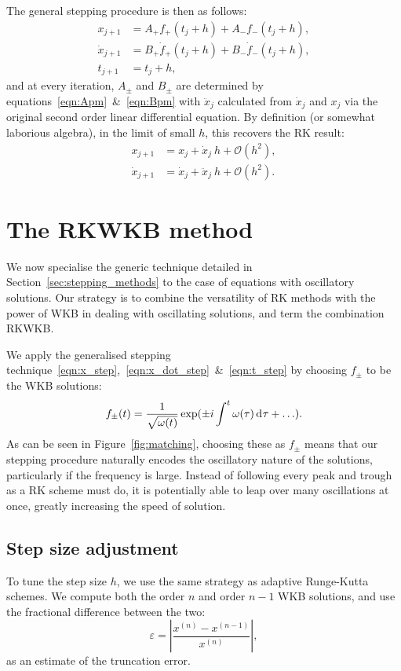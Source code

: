 The general stepping procedure is then as follows:
\begin{align}
  x_{j+1} &= A_+ f_+(t_j + h) + A_- f_-(t_j + h),
  \label{eqn:x_step} \\
  \dot{x}_{j+1} &= B_+ \dot{f}_+(t_j + h) + B_- \dot{f}_-(t_j + h),
  \label{eqn:x_dot_step} \\
  t_{j+1} &= t_j+h,
  \label{eqn:t_step}
\end{align}
and at every iteration, \(A_\pm\) and \(B_\pm\) are determined by equations~\eqref{eqn:Apm}~\&~\eqref{eqn:Bpm} with \(\ddot{x}_j\) calculated from \(\dot{x}_j\) and \(x_j\) via the original second order linear differential equation. By definition (or somewhat laborious algebra), in the limit of small \(h\), this recovers the RK result:
\begin{align}
    x_{j+1} &= x_j + \dot{x}_j \: h + \mathcal{O}(h^2), \\
    \dot{x}_{j+1} &= \dot{x}_j  + \ddot{x}_j\: h + \mathcal{O}(h^2). 
\end{align}


\section{The RKWKB method}
\label{sec:rkwkb}
We now specialise the generic technique detailed in Section~\ref{sec:stepping_methods} to the case of equations with oscillatory solutions. Our strategy is to combine the versatility of RK methods with the power of WKB in dealing with oscillating solutions, and term the combination RKWKB\@. 

We apply the generalised stepping technique~\eqref{eqn:x_step},~\eqref{eqn:x_dot_step}~\&~\eqref{eqn:t_step} by choosing \(f_\pm\) to be the WKB solutions:
\begin{equation}
    f_\pm(t) = \frac{1}{\sqrt{\omega(t)}}\exp(\pm i \int^t \omega(\tau)\operatorname{d}^{}\!{\tau} +\ldots).
\end{equation}
As can be seen in Figure~\ref{fig:matching}, choosing these as \(f_\pm\) means that our stepping procedure naturally encodes the oscillatory nature of the solutions, particularly if the frequency is large. Instead of following every peak and trough as a RK scheme must do, it is potentially able to leap over many oscillations at once, greatly increasing the speed of solution.

\subsection{Step size adjustment}
To tune the step size \(h\), we use the same strategy as adaptive Runge-Kutta schemes. We compute both the order \(n\) and order \(n-1\) WKB solutions, and use the fractional difference between the two:
\begin{equation}
  \varepsilon = \left|\frac{x^{(n)}-x^{(n-1)}}{x^{(n)}}\right|,
\end{equation}
as an estimate of the truncation error. 

